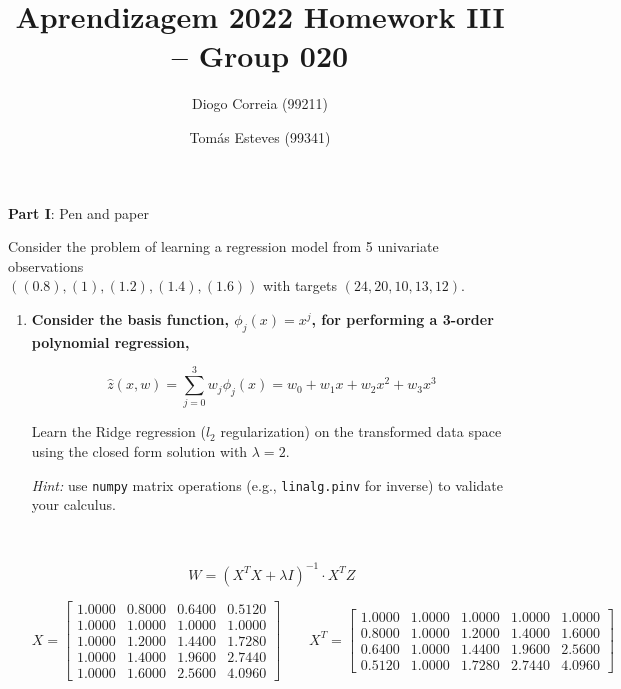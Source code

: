 \documentclass[12pt]{article}
\title{\large{Aprendizagem 2022}\vskip 0.2cm Homework III -- Group 020}
\date{}
\author{Diogo Correia (99211) \and Tomás Esteves (99341)}
\begin{document}
\maketitle
\begin{center}
    \large{\vskip -1.0cm\textbf{Part I}: Pen and paper}
\end{center}

Consider the problem of learning a regression model from 5 univariate observations\\
$\left((0.8), (1), (1.2), (1.4), (1.6)\right)$ with targets $\left(24, 20, 10, 13, 12\right)$.

\begin{enumerate}[leftmargin=\labelsep]
    \item {\bfseries
          Consider the basis function, $\phi_j (x) = x^j$, for performing a 3-order
          polynomial regression,

          $$
              \hat{z}(x, w) = \sum_{j=0}^{3} w_j \phi_j (x)
              = w_0 + w_1 x + w_2 x^2 + w_3 x^3
          $$

          Learn the Ridge regression ($l_2$ regularization) on the transformed data
          space using the closed form solution with $\lambda = 2$.

          \textit{Hint:} use \texttt{numpy} matrix operations (e.g., \texttt{linalg.pinv} for inverse)
          to validate your calculus.
          }\\
          \vspace{0.5em}

          $$
              W = \left(X^T X + \lambda I\right)^{-1} \cdot X^T Z
          $$

          $$
              X = \begin{bmatrix}{}
                  1.0000 & 0.8000 & 0.6400 & 0.5120 \\
                  1.0000 & 1.0000 & 1.0000 & 1.0000 \\
                  1.0000 & 1.2000 & 1.4400 & 1.7280 \\
                  1.0000 & 1.4000 & 1.9600 & 2.7440 \\
                  1.0000 & 1.6000 & 2.5600 & 4.0960
              \end{bmatrix}
              \quad
              \quad
              X^T =\begin{bmatrix}{}
                  1.0000 & 1.0000 & 1.0000 & 1.0000 & 1.0000 \\
                  0.8000 & 1.0000 & 1.2000 & 1.4000 & 1.6000 \\
                  0.6400 & 1.0000 & 1.4400 & 1.9600 & 2.5600 \\
                  0.5120 & 1.0000 & 1.7280 & 2.7440 & 4.0960
              \end{bmatrix}
          $$


\end{enumerate}
\end{document}
